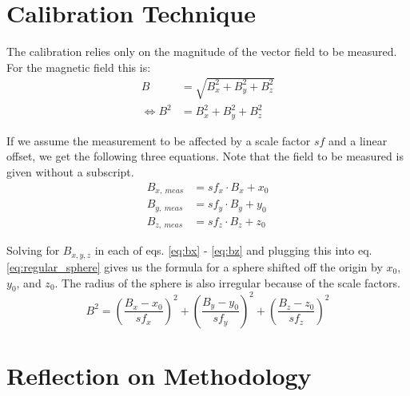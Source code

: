 \section{Calibration Technique \label{sec:meth:calibration_technique}}
The calibration relies only on the magnitude of the vector field to be measured. For the magnetic field this is:
\begin{align}
    B& = \sqrt{B_x^2+B_y^2+B_z^2} \\
    \iff B^2& = B_x^2+B_y^2+B_z^2 
    \label{eq:regular_sphere}
\end{align}

If we assume the measurement to be affected by a scale factor $sf$ and a linear offset, we get the following three equations. Note that the field to be measured is given without a subscript.
\begin{align}
    B_{x,\ meas} &= sf_x\cdot B_x+x_0 \label{eq:bx}\\
    B_{y,\ meas} &= sf_y\cdot B_y+y_0 \label{eq:by}\\
    B_{z,\ meas} &= sf_z\cdot B_z+z_0 \label{eq:bz}
\end{align}

Solving for $B_{x,y,z}$ in each of eqs. \eqref{eq:bx} - \eqref{eq:bz} and plugging this into eq. \eqref{eq:regular_sphere} gives us the formula for a sphere shifted off the origin by $x_0$, $y_0$, and $z_0$. The radius of the sphere is also irregular because of the scale factors.
\begin{equation}
    B^2=\left(\frac{B_x-x_0}{sf_x}\right)^2 + \left(\frac{B_y-y_0}{sf_y}\right)^2 + \left(\frac{B_z-z_0}{sf_z}\right)^2
    \label{eq:irregular_sphere}
\end{equation}


\section{Reflection on Methodology \label{sec:meth:reflection_methodology}}
